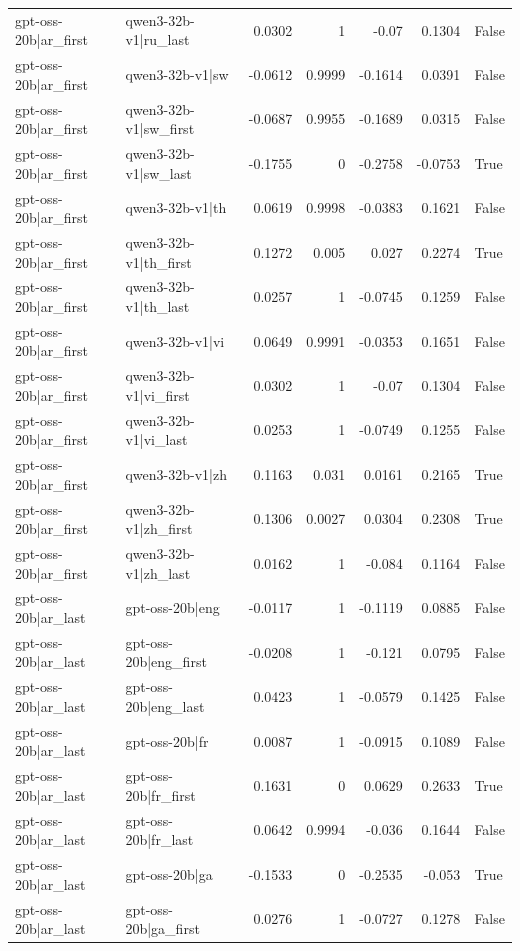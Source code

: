 \begin{table}
\begin{tabular}{l l r r r r l}
gpt-oss-20b|ar_first & qwen3-32b-v1|ru_last & 0.0302 & 1 & -0.07 & 0.1304 & False \\
gpt-oss-20b|ar_first & qwen3-32b-v1|sw & -0.0612 & 0.9999 & -0.1614 & 0.0391 & False \\
gpt-oss-20b|ar_first & qwen3-32b-v1|sw_first & -0.0687 & 0.9955 & -0.1689 & 0.0315 & False \\
gpt-oss-20b|ar_first & qwen3-32b-v1|sw_last & -0.1755 & 0 & -0.2758 & -0.0753 & True \\
gpt-oss-20b|ar_first & qwen3-32b-v1|th & 0.0619 & 0.9998 & -0.0383 & 0.1621 & False \\
gpt-oss-20b|ar_first & qwen3-32b-v1|th_first & 0.1272 & 0.005 & 0.027 & 0.2274 & True \\
gpt-oss-20b|ar_first & qwen3-32b-v1|th_last & 0.0257 & 1 & -0.0745 & 0.1259 & False \\
gpt-oss-20b|ar_first & qwen3-32b-v1|vi & 0.0649 & 0.9991 & -0.0353 & 0.1651 & False \\
gpt-oss-20b|ar_first & qwen3-32b-v1|vi_first & 0.0302 & 1 & -0.07 & 0.1304 & False \\
gpt-oss-20b|ar_first & qwen3-32b-v1|vi_last & 0.0253 & 1 & -0.0749 & 0.1255 & False \\
gpt-oss-20b|ar_first & qwen3-32b-v1|zh & 0.1163 & 0.031 & 0.0161 & 0.2165 & True \\
gpt-oss-20b|ar_first & qwen3-32b-v1|zh_first & 0.1306 & 0.0027 & 0.0304 & 0.2308 & True \\
gpt-oss-20b|ar_first & qwen3-32b-v1|zh_last & 0.0162 & 1 & -0.084 & 0.1164 & False \\
gpt-oss-20b|ar_last & gpt-oss-20b|eng & -0.0117 & 1 & -0.1119 & 0.0885 & False \\
gpt-oss-20b|ar_last & gpt-oss-20b|eng_first & -0.0208 & 1 & -0.121 & 0.0795 & False \\
gpt-oss-20b|ar_last & gpt-oss-20b|eng_last & 0.0423 & 1 & -0.0579 & 0.1425 & False \\
gpt-oss-20b|ar_last & gpt-oss-20b|fr & 0.0087 & 1 & -0.0915 & 0.1089 & False \\
gpt-oss-20b|ar_last & gpt-oss-20b|fr_first & 0.1631 & 0 & 0.0629 & 0.2633 & True \\
gpt-oss-20b|ar_last & gpt-oss-20b|fr_last & 0.0642 & 0.9994 & -0.036 & 0.1644 & False \\
gpt-oss-20b|ar_last & gpt-oss-20b|ga & -0.1533 & 0 & -0.2535 & -0.053 & True \\
gpt-oss-20b|ar_last & gpt-oss-20b|ga_first & 0.0276 & 1 & -0.0727 & 0.1278 & False \\

\end{tabular}
\end{table}
